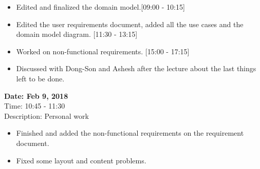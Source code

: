 \documentclass[12pt]{article}
\begin{document}
\begin{flushleft}
\begin{itemize}
\item Edited and finalized the domain model.[09:00 - 10:15]
\item Edited the user requirements document, added all the use cases and the domain model diagram. [11:30 - 13:15]
\item Worked on non-functional requirements. [15:00 - 17:15] 
\item Discussed with Dong-Son and Ashesh after the lecture about the last things left to be done.
\end{itemize}

\textbf{Date: Feb 9, 2018} \\
Time: 10:45 - 11:30 \\
Description: Personal work  \\
\begin{itemize}

\item Finished and added the non-functional requirements on the requirement document.
\item Fixed some layout and content problems.

\end{itemize}
\end{flushleft}
\end{document}
